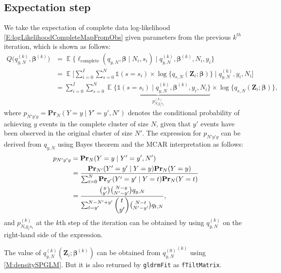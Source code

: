 \documentclass[reqno]{amsart}
\DeclareMathOperator{\E}{\mathbb{E}}
\begin{document}
\subsection{Expectation step}

We take the expectation of complete data log-likelihood \eqref{E:logLikelihoodCompleteMapFromObs} given parameters from the previous $k^{th}$ iteration, which is shown as follows:
\begin{equation}\label{E:ExpectedlogLikelihoodCompleteMapFromObs}
\begin{split}
    Q \bigg( q_{y,N}^{(k)}, \boldsymbol{\beta}^{(k)} \bigg) &= 
     \E \bigg\{ \ell_{\text{complete}} (q_{y,N}, \boldsymbol{\beta} \mid N_i, s_i) \mid q_{y,N}^{(k)}, \boldsymbol{\beta}^{(k)}, N_i, y_i \bigg\} \\
    &= \E \Bigg[ \sum_{i=0}^I \sum_{s=0}^N {\mathds{1}}(s=s_i) \times \log \{ q_{s,N}(\boldsymbol{Z}_i; \boldsymbol{\beta}) \} \mid q_{y,N}^{(k)}, y_i,N_i \Bigg] \\
    &= \sum_{i=0}^I \sum_{s=0}^N \underbrace{ \E \big\{ {\mathds{1}}(s=s_i) \mid q_{y,N}^{(k)}, \boldsymbol{\beta}^{(k)}, y_i, N_i \big\}}_{p_{N_iy_is_i}^{(k)}} \times \log \{q_{s,N}(\boldsymbol{Z}_i; \boldsymbol{\beta}) \},
\end{split}
\end{equation}
where $p_{N'y'y} = \textbf{Pr}_N(Y=y \mid Y'=y',N')$ denotes the conditional probability of achieving $y$ events in the complete cluster of size $N$, given that $y'$ events have been observed in the original cluster of size $N'$. 
The expression for $p_{N'y'y}$ can be derived from $q_{y,N}$ using Bayes theorem and the MCAR interpretation as follows:
\begin{equation}\label{D:prst}
\begin{split}
p_{N'y'y} &= \textbf{Pr}_N(Y=y \mid Y'=y',N') \\ 
          &= \frac{\textbf{Pr}_{N'}(Y'=y' \mid Y=y) \textbf{Pr}_N(Y=y)}{\sum_{t=0}^{N} \textbf{Pr}_{y'}(Y'=y' \mid Y=t) \textbf{Pr}_N(Y=t)} \\ 
          &= \frac{\binom{y}{y'} \binom{N-y}{N'-y'} q_{y,N}}{\sum_{t=y'}^{N-N'+y'} \dbinom{t}{y'} \binom{N-t}{N'-y'} q_{t,N}},
\end{split}
\end{equation}
and $p_{N_iy_is_i}^{(k)}$ at the $k$th step of the iteration can be obtained by using $q_{y,N}^{(k)}$ on the right-hand side of the expression. 

The value of $q_{y,N}^{(k)}(\boldsymbol{Z}_i; \boldsymbol{\beta}^{(k)})$ can be obtained from ${q_{y,N}^{(0)}}^{(k)}$ using \ref{M:densitySPGLM}. But it is also returned by \texttt{gldrmFit} as \texttt{fTiltMatrix}.
\end{document}
